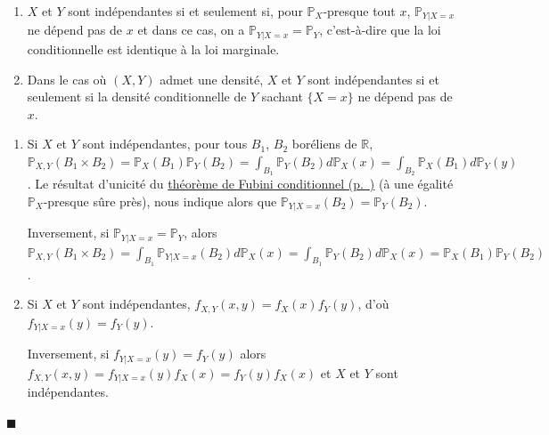 \begin{proposition}\label{III-crituxe8re-dinduxe9pendance}

\begin{enumerate}
\def\labelenumi{\arabic{enumi}.}
\item
  \(X\) et \(Y\) sont indépendantes si et seulement si, pour
  \(\mathbb{P}_X\)-presque tout \(x\), \(\mathbb{P}_{Y |X = x}\) ne
  dépend pas de \(x\) et dans ce cas, on a
  \(\mathbb{P}_{Y |X = x} = \mathbb{P}_Y\), c'est-à-dire que la loi
  conditionnelle est identique à la loi marginale.
\item
  Dans le cas où \((X,Y)\) admet une densité, \(X\) et \(Y\) sont
  indépendantes si et seulement si la densité conditionnelle de \(Y\)
  sachant \(\{X = x\}\) ne dépend pas de \(x\).
\end{enumerate}
\end{proposition}

\begin{preuve}
\begin{enumerate}
\def\labelenumi{\arabic{enumi}.}
\item
  Si \(X\) et \(Y\) sont indépendantes, pour tous \(B_1\), \(B_2\)
  boréliens de \(\mathbb{R}\),
  \(\mathbb{P}_{X,Y} (B_1 \times B_2) = \mathbb{P}_X(B_1)\mathbb{P}_Y(B_2) = \int_{B_1}\mathbb{P}_Y(B_2)d\mathbb{P}_X(x) = \int_{B_2}\mathbb{P}_X(B_1) d\mathbb{P}_Y(y)\).
  Le résultat d'unicité du \protect\hyperref[III-fubinicond]{théorème de
  Fubini conditionnel (p.~\pageref*{III-fubinicond})} (à une égalité
  \(\mathbb{P}_X\)-presque sûre près), nous indique alors que
  \(\mathbb{P}_{Y|X=x}(B_2) = \mathbb{P}_Y(B_2)\).

  Inversement, si \(\mathbb{P}_{Y |X = x} = \mathbb{P}_Y\), alors
  \(\mathbb{P}_{X,Y} (B_1 \times B_2) = \int_{B_1}\mathbb{P}_{Y|X=x}(B_2)d\mathbb{P}_X(x) = \int_{B_1}\mathbb{P}_Y(B_2)d\mathbb{P}_X(x) = \mathbb{P}_X(B_1)\mathbb{P}_Y(B_2)\).
\item
  Si \(X\) et \(Y\) sont indépendantes,
  \(f_{X,Y} (x,y) = f_X(x) f_Y(y)\), d'où \(f_{Y|X=x}(y) = f_Y(y)\).

  Inversement, si \(f_{Y|X=x}(y) = f_Y(y)\) alors
  \(f_{X,Y}(x,y) = f_{Y|X=x}(y) f_X(x) = f_Y(y)f_X(x)\) et \(X\) et
  \(Y\) sont indépendantes.
\end{enumerate}

\hfill$\blacksquare$
\end{preuve}

